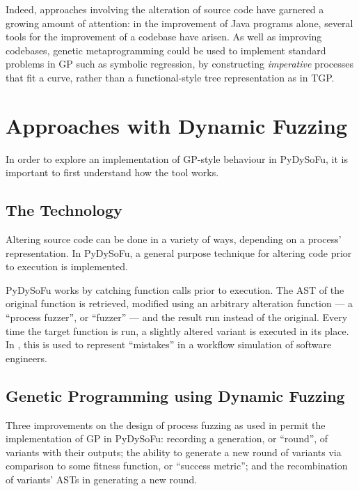 \documentclass[draft,12pt]{llncs}   %
\begin{document}
Indeed, approaches involving the alteration of source code have garnered a
growing amount of attention: in the improvement of Java programs alone, several
tools for the improvement of a codebase have
arisen\cite{cody2015locogp,arcuri2008multi,castle2012evolving}. As well as
improving codebases, genetic metaprogramming could be used to implement standard
problems in GP such as symbolic regression, by constructing \emph{imperative}
processes that fit a curve, rather than a functional-style tree representation
as in TGP\cite{koza1994genetic}.\par


\section{Approaches with Dynamic Fuzzing}

In order to explore an implementation of GP-style behaviour in PyDySoFu, it is
important to first understand how the tool works.\par




\label{sec:dynamic_fuzzing}
\subsection{The Technology}
Altering source code can be done in a variety of ways, depending on a process'
representation. In PyDySoFu\cite{pydysofu}, a general purpose technique for altering
code prior to execution is implemented.\par

PyDySoFu works by catching function calls prior to execution. The AST of the
original function is retrieved, modified using an arbitrary alteration function
--- a ``process fuzzer'', or ``fuzzer'' --- and the result run instead of the
original. Every time the target function is run, a slightly altered
variant is executed in its place. In \cite{wallis2018a}, this is used to represent
``mistakes'' in a workflow simulation of software engineers.\par

\subsection{Genetic Programming using Dynamic Fuzzing}
Three improvements on the design of process fuzzing as used in
\cite{wallis2018a} permit the implementation of GP in PyDySoFu: recording a
generation, or ``round'', of variants with their outputs; the ability to
generate a new round of variants via comparison to some fitness function, or
``success metric''; and the recombination of variants' ASTs in generating a new
round.\par
\end{document}
